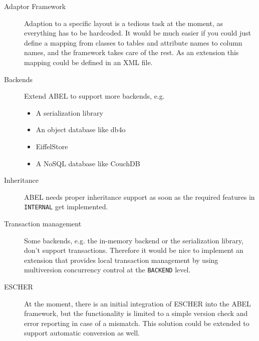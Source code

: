 \begin{description}
 \item [Adaptor Framework] Adaption to a specific layout is a tedious task at the moment, as everything has to be hardcoded. 
It would be much easier if you could just define a mapping from classes to tables and attribute names to column names, and the framework takes care of the rest.
As an extension this mapping could be defined in an XML file.
\item [Backends] Extend ABEL to support more backends, e.g.
\begin{itemize}
 \item A serialization library
 \item An object database like db4o
 \item EiffelStore
 \item A NoSQL database like CouchDB
\end{itemize}
 \item [Inheritance] ABEL needs proper inheritance support as soon as the required features in \lstinline!INTERNAL! get implemented.
\item [Transaction management] Some backends, e.g. the in-memory backend or the serialization library, don't support transactions.
 Therefore it would be nice to implement an extension that provides local transaction management by using multiversion concurrency control at the \lstinline!BACKEND! level.
\item [ESCHER] At the moment, there is an initial integration of ESCHER into the ABEL framework, but the functionality is limited to a simple version check and error reporting in case of a mismatch.
 This solution could be extended to support automatic conversion as well.
\end{description}
